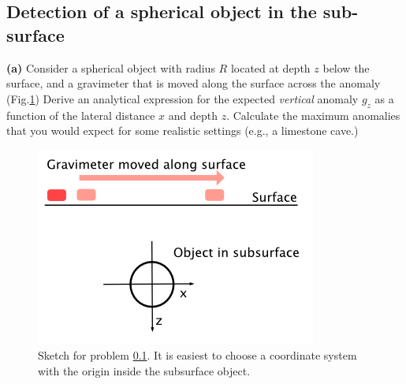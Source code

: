 \documentclass[a4paper,12pt]{article}
\begin{document}
\subsection{Detection of a spherical object in the sub-surface}
\label{Sec:SphereInSubsurface}
\textbf{(a)} Consider a spherical object with radius $R$ located at depth $z$ below the surface, and a gravimeter that is moved along the surface across the anomaly (Fig.\ref{Fig:SphereInSubsurface}) Derive an analytical expression for the expected \textit{vertical} anomaly $g_z$ as a function of the lateral distance $x$ and depth $z$. Calculate the maximum anomalies that you would expect for some realistic settings (e.g., a limestone cave.)\\
\begin{figure}
\centering
\begin{minipage}[c]{0.5\textwidth}
\begin{center}
    \includegraphics[width=\textwidth]{Figures/Gravimetry/Gravimetry01_SphereSketch.png}
\end{center}
\caption{Sketch for problem \ref{Sec:SphereInSubsurface}. It is easiest to choose a coordinate system with the origin inside the subsurface object.}
\label{Fig:SphereInSubsurface}
\end{minipage}
\end{figure}
\end{document}
